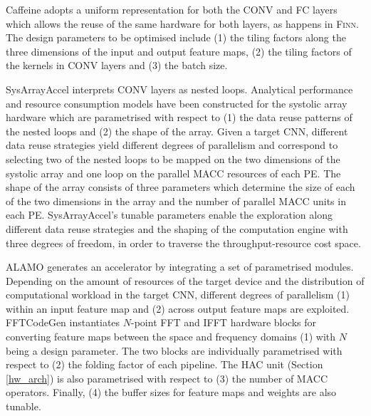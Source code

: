\documentclass[format=acmsmall, review=false, screen=true]{acmart}
\begin{document}
Caffeine adopts a uniform representation for both the CONV and FC layers which allows the reuse of the same hardware for both layers, as happens in \textsc{Finn}. The design parameters to be optimised include (1) the tiling factors along the three dimensions of the input and output feature maps, (2) the tiling factors of the kernels in CONV layers and (3) the batch size. 

SysArrayAccel interprets CONV layers as nested loops. Analytical performance and resource consumption models have been constructed for the systolic array hardware which are parametrised with respect to (1) the data reuse patterns of the nested loops and (2) the shape of the array. Given a target CNN, different data reuse strategies yield different degrees of parallelism and correspond to selecting two of the nested loops to be mapped on the two dimensions of the systolic array and one loop on the parallel MACC resources of each PE. The shape of the array consists of three parameters which determine the size of each of the two dimensions in the array and the number of parallel MACC units in each PE. SysArrayAccel's tunable parameters enable the exploration along different data reuse strategies and the shaping of the computation engine with three degrees of freedom, in order to traverse the throughput-resource cost space.

{\color{black}ALAMO generates an accelerator by integrating a set of parametrised modules. Depending on the amount of resources of the target device and the distribution of computational workload in the target CNN, different degrees of parallelism (1) within an input feature map and (2) across output feature maps are exploited. FFTCodeGen instantiates $N$-point FFT and IFFT hardware blocks for converting feature maps between the space and frequency domains (1) with $N$ being a design parameter. The two blocks are individually parametrised with respect to (2) the folding factor of each pipeline. The HAC unit (Section \ref{hw_arch}) is also parametrised with respect to (3) the number of MACC operators. Finally, (4) the buffer sizes for feature maps and weights are also tunable.
}
\end{document}
